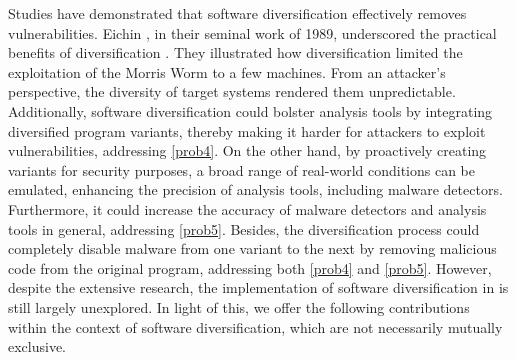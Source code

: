 Studies have demonstrated that software diversification effectively removes vulnerabilities. 
Eichin \etal, in their seminal work of 1989, underscored the practical benefits of diversification \cite{36307}. 
They illustrated how diversification limited the exploitation of the Morris Worm to a few machines. 
From an attacker's perspective, the diversity of target systems rendered them unpredictable.
Additionally, software diversification could bolster \Wasm analysis tools by integrating diversified program variants, thereby making it harder for attackers to exploit vulnerabilities, addressing \ref{prob4}. 
On the other hand, by proactively creating variants for security purposes, a broad range of real-world conditions can be emulated, enhancing the precision of \Wasm analysis tools, including \Wasm malware detectors. 
Furthermore, it could increase the accuracy of \Wasm malware detectors and \Wasm analysis tools in general, addressing \ref{prob5}. 
Besides, the diversification process could completely disable malware from one variant to the next by removing malicious code from the original program, addressing both \ref{prob4} and \ref{prob5}. 
However, despite the extensive research, the implementation of software diversification in \Wasm is still largely unexplored. 
In light of this, we offer the following contributions within the context of software diversification, which are not necessarily mutually exclusive.


